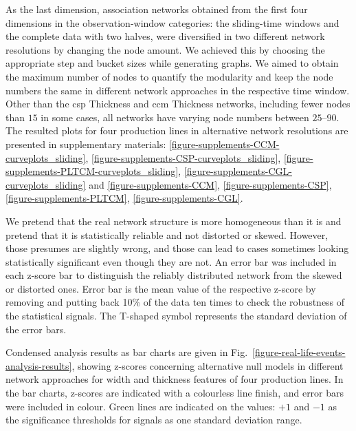 As the last dimension, association networks obtained from the first four dimensions in the observation-window categories: the sliding-time windows and the complete data with two halves, were diversified in two different network resolutions by changing the node amount. We achieved this by choosing the appropriate step and bucket sizes while generating graphs. We aimed to obtain the maximum number of nodes to quantify the modularity and keep the node numbers the same in different network approaches in the respective time window. Other than the \acs{csp} Thickness and \acs{ccm} Thickness networks, including fewer nodes than $15$ in some cases, all networks have varying node numbers between $25$--$90$. The resulted plots for four production lines in alternative network resolutions are presented in supplementary materials: \ref{figure-supplements-CCM-curveplots_sliding}, \ref{figure-supplements-CSP-curveplots_sliding}, \ref{figure-supplements-PLTCM-curveplots_sliding}, \ref{figure-supplements-CGL-curveplots_sliding} and \ref{figure-supplements-CCM}, \ref{figure-supplements-CSP}, \ref{figure-supplements-PLTCM}, \ref{figure-supplements-CGL}.

We pretend that the real network structure is more homogeneous than it is and pretend that it is statistically reliable and not distorted or skewed. However, those presumes are slightly wrong, and those can lead to cases sometimes looking statistically significant even though they are not. An error bar was included in each z-score bar to distinguish the reliably distributed network from the skewed or distorted ones. Error bar is the mean value of the respective z-score by removing and putting back 10\% of the data ten times to check the robustness of the statistical signals. The T-shaped symbol represents the standard deviation of the error bars.

Condensed analysis results as bar charts are given in Fig.~\ref{figure-real-life-events-analysis-results}, showing z-scores concerning alternative null models in different network approaches for width and thickness features of four production lines. In the bar charts, z-scores are indicated with a colourless line finish, and error bars were included in colour. Green lines are indicated on the values: $+1$ and $-1$ as the significance thresholds for signals as one standard deviation range.
\renewcommand{\aa}{Analysis Bar Chart Results:}


\newcommand{\bb}{Modularity Values and Z-scores in Different Network Resolutions}
\newcommand{\cc}{Analysis Curve Plot Results:}
\newcommand{\dd}{Modularity Values and Z-scores in Sliding-time Windows \& Different Network Resolutions}
\newcommand{\ee}{Modularity Values and Z-scores in Discrete-time Windows}

